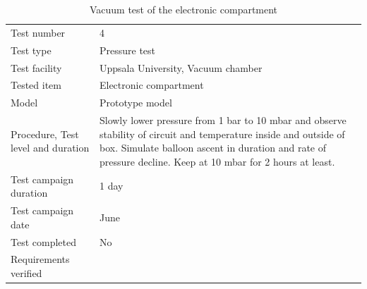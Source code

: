 \documentclass[ %
  a4paper, %
  11pt, %
  openany, %
  parskip, %
  toc=totoc, %
  listof=totoc, %
  bibliography=totoc %
]{scrreprt} %
\providecommand{\DIFaddbeginFL}{} %
\providecommand{\DIFaddendFL}{} %
\providecommand{\DIFdelbeginFL}{} %
\providecommand{\DIFdelendFL}{} %
\providecommand{\DIFscaledelfig}{0.5}
\newlength{\DIFdelgraphicswidth} %
\newlength{\DIFdelgraphicsheight} %
\providecommand{\DIFaddincludegraphics}[2][]{{\color{blue}\fbox{\DIFOincludegraphics[#1]{#2}}}} %
\providecommand{\DIFdelincludegraphics}[2][]{%
\sbox{\DIFdelgraphicsbox}{\DIFOincludegraphics[#1]{#2}}%
\settoboxwidth{\DIFdelgraphicswidth}{\DIFdelgraphicsbox} %
\settoboxtotalheight{\DIFdelgraphicsheight}{\DIFdelgraphicsbox} %
\scalebox{\DIFscaledelfig}{%
\parbox[b]{\DIFdelgraphicswidth}{\usebox{\DIFdelgraphicsbox}\\[-\baselineskip] \rule{\DIFdelgraphicswidth}{0em}}\llap{\resizebox{\DIFdelgraphicswidth}{\DIFdelgraphicsheight}{%
\setlength{\unitlength}{\DIFdelgraphicswidth}%
\begin{picture}(1,1)%
\thicklines\linethickness{2pt} %
{\color[rgb]{1,0,0}\put(0,0){\framebox(1,1){}}}%
{\color[rgb]{1,0,0}\put(0,0){\line( 1,1){1}}}%
{\color[rgb]{1,0,0}\put(0,1){\line(1,-1){1}}}%
\end{picture}%
}\hspace*{3pt}}} %
} %
\DeclareRobustCommand{\DIFaddbeginFL}{\DIFOaddbeginFL \let\includegraphics\DIFaddincludegraphics} %
\DeclareRobustCommand{\DIFaddendFL}{\DIFOaddendFL \let\includegraphics\DIFOincludegraphics} %
\DeclareRobustCommand{\DIFdelbeginFL}{\DIFOdelbeginFL \let\includegraphics\DIFdelincludegraphics} %
\DeclareRobustCommand{\DIFdelendFL}{\DIFOaddendFL \let\includegraphics\DIFOincludegraphics} %
\begin{document}
\begin{table}[H]
\centering
\caption{Vacuum test of the electronic compartment}
\DIFdelbeginFL %
\DIFdelendFL \DIFaddbeginFL \label{tab:test4}
\begin{tabular}{L{5cm}L{10cm}}
\toprule
Test number & 4 \\
Test type & Pressure test \\
Test facility & Uppsala University, Vacuum chamber \\
Tested item & Electronic compartment \\
Model & Prototype model \\
Procedure, Test level and duration & Slowly lower pressure from 1 bar to 10 mbar and observe stability of circuit and temperature inside and outside of box. Simulate balloon ascent in duration and rate of pressure decline. Keep at 10 mbar for 2 hours at least. \\
Test campaign duration & 1 day \\
Test campaign date & June \\
Test completed & No \\
Requirements verified & \\
\bottomrule
\end{tabular}\DIFaddendFL 
\end{table}
\end{document}
